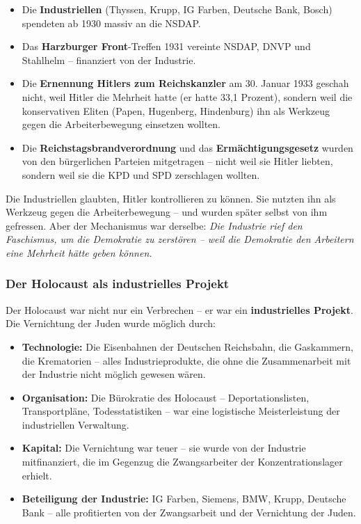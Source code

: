\begin{itemize}
    \item Die \textbf{Industriellen} (Thyssen, Krupp, IG Farben, Deutsche Bank, Bosch) spendeten ab 1930 massiv an die NSDAP.
    \item Das \textbf{Harzburger Front}-Treffen 1931 vereinte NSDAP, DNVP und Stahlhelm – finanziert von der Industrie.
    \item Die \textbf{Ernennung Hitlers zum Reichskanzler} am 30. Januar 1933 geschah nicht, weil Hitler die Mehrheit hatte (er hatte 33,1 Prozent), sondern weil die konservativen Eliten (Papen, Hugenberg, Hindenburg) ihn als Werkzeug gegen die Arbeiterbewegung einsetzen wollten.
    \item Die \textbf{Reichstagsbrandverordnung} und das \textbf{Ermächtigungsgesetz} wurden von den bürgerlichen Parteien mitgetragen – nicht weil sie Hitler liebten, sondern weil sie die KPD und SPD zerschlagen wollten.
\end{itemize}

Die Industriellen glaubten, Hitler kontrollieren zu können. Sie nutzten ihn als Werkzeug gegen die Arbeiterbewegung – und wurden später selbst von ihm gefressen. Aber der Mechanismus war derselbe: \emph{Die Industrie rief den Faschismus, um die Demokratie zu zerstören – weil die Demokratie den Arbeitern eine Mehrheit hätte geben können.}

\subsubsection{Der Holocaust als industrielles Projekt}

Der Holocaust war nicht nur ein Verbrechen – er war ein \textbf{industrielles Projekt}. Die Vernichtung der Juden wurde möglich durch:

\begin{itemize}
    \item \textbf{Technologie:} Die Eisenbahnen der Deutschen Reichsbahn, die Gaskammern, die Krematorien – alles Industrieprodukte, die ohne die Zusammenarbeit mit der Industrie nicht möglich gewesen wären.
    \item \textbf{Organisation:} Die Bürokratie des Holocaust – Deportationslisten, Transportpläne, Todesstatistiken – war eine logistische Meisterleistung der industriellen Verwaltung.
    \item \textbf{Kapital:} Die Vernichtung war teuer – sie wurde von der Industrie mitfinanziert, die im Gegenzug die Zwangsarbeiter der Konzentrationslager erhielt.
    \item \textbf{Beteiligung der Industrie:} IG Farben, Siemens, BMW, Krupp, Deutsche Bank – alle profitierten von der Zwangsarbeit und der Vernichtung der Juden.
\end{itemize}

